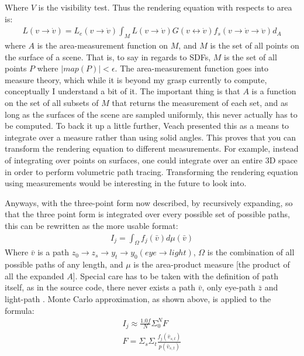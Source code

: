 \documentclass{article}
\begin{document}
    Where $V$ is the visibility test. Thus the rendering equation with respects
    to area is:
  \begin{align}
    L(v \rightarrow \dot{v}) = L_e(v \rightarrow \dot{v}) \int_ML(v \rightarrow
    \dot{v}) G(v\leftrightarrow \dot{v}) f_s(v\rightarrow \dot{v} \rightarrow
    \ddot{v}) d_A
  \end{align}
    where $A$ is the area-measurement function on $M$, and $M$ is the set of all
points on the surface of a scene. That is, to say in regards to SDFs, $M$ is the
set of all points $P$ where $|map(P)| < \epsilon$. The area-measurement function
goes into measure theory, which while it is beyond my grasp currently to
compute, conceptually I understand a bit of it. The important thing is that $A$
is a function on the set of all subsets of $M$ that returns the measurement of
each set, and as long as the surfaces of the scene are sampled uniformly, this
never actually has to be computed. To back it up a little further, Veach
presented this as a means to integrate over a measure rather than using solid
angles. This proves that you can transform the rendering equation to different
measurements. For example, instead of integrating over points on surfaces, one
could integrate over an entire 3D space in order to perform volumetric path
tracing. Transforming the rendering equation using measurements would be
interesting in the future to look into.
    
    
    Anyways, with the three-point form now described, by recursively expanding,
so that the three point form is integrated over every possible set of possible
paths, this can be rewritten as the more usable format:
  \begin{align} I_j = \int_\Omega f_j(\bar{v}) d\mu(\bar{v}) \end{align}
    Where $\bar{v}$ is a path $z_0\rightarrow z_s \rightarrow y_t \rightarrow
    y_0 (eye \rightarrow light)$, $\Omega$ is the combination of all possible
    paths of any length, and $\mu$ is the area-product measure [the product of
all the expanded $A$]. Special care has to be taken with the definition of
    path itself, as in the source code, there never exists a path $\bar{v}$,
    only eye-path $\bar{z}$ and light-path . Monte Carlo approximation, as shown
above, is applied to the formula:
  \begin{align}
    I_j \approx \frac{1.0f}{N}\Sigma_0^NF\\
    F = \Sigma_s\Sigma_t\frac{f_j(\bar{v}_{s, t})}{p(\bar{v}_{s, t})}
  \end{align}
\end{document}
